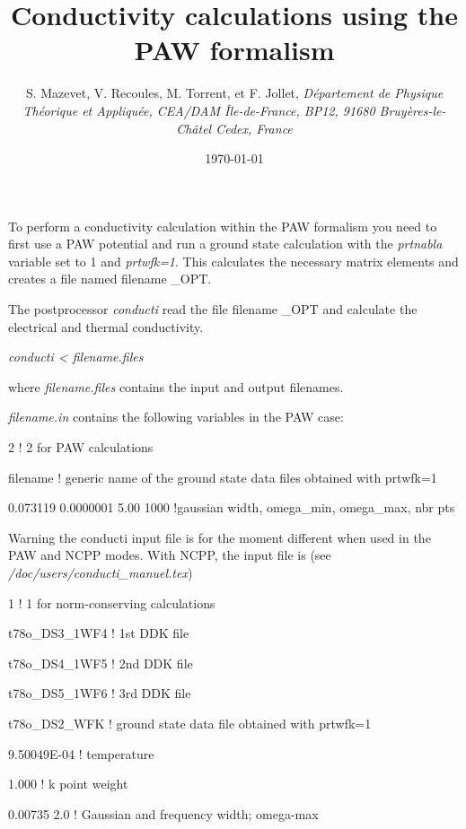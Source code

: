 \documentclass{article}
\begin{document}
%
\title{Conductivity calculations using the PAW formalism }

\author{S. Mazevet, V. Recoules, M. Torrent, et F. Jollet,
{\it D\'epartement de Physique Th\'eorique et Appliqu\'ee,
CEA/DAM \^Ile-de-France,
BP12, 91680 Bruy\`eres-le-Ch\^atel Cedex, France}}

\date{\today}

\vspace{0.5cm}
To perform a conductivity calculation within the PAW formalism you need to first use
a PAW potential and run a ground state calculation with the \textit{prtnabla} variable
 set to 1 and \textit{prtwfk=1}.
This calculates the necessary matrix elements and creates a file named filename \_OPT.

The postprocessor \textit{conducti} read the file filename \_OPT and calculate
the electrical and thermal conductivity.

\textit{conducti < filename.files}

where \textit{filename.files} contains the input and output filenames.
\vspace{0.25cm}

\textit{filename.in} contains the following variables in the PAW case:


2            ! 2 for PAW calculations


filename     ! generic name of the ground state data files obtained with   prtwfk=1


0.073119 0.0000001 5.00 1000   !gaussian width, omega\_min, omega\_max, nbr pts
\vspace{0.5cm}

Warning the conducti input file is for the moment different when used in the
PAW and NCPP modes. With NCPP, the input file is (see \textit{/doc/users/conducti\_manuel.tex})




1                 ! 1 for norm-conserving calculations


t78o\_DS3\_1WF4 ! 1st DDK file


t78o\_DS4\_1WF5 ! 2nd DDK file


t78o\_DS5\_1WF6 ! 3rd DDK file


t78o\_DS2\_WFK  ! ground state data file obtained with   prtwfk=1


9.50049E-04   ! temperature


1.000         ! k point weight


0.00735  2.0  ! Gaussian and frequency width; omega-max
\end{document}
